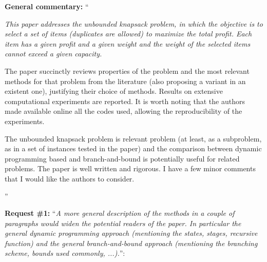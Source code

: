 \documentclass{elsarticle}
\begin{document}
\textbf{General commentary:} ``{\itshape
This paper addresses the unbounded knapsack problem, in which the objective is to select a set of items (duplicates are allowed) to maximize the total profit. Each item has a given profit and a given weight and the weight of the selected items cannot exceed a given capacity.

The paper succinctly reviews properties of the problem and the most relevant methods for that problem from the literature (also proposing a variant in an existent one), justifying their choice of methods. Results on extensive computational experiments are reported. It is worth noting that the authors made available online all the codes used, allowing the reproducibility of the experiments.

The unbounded knapsack problem is relevant problem (at least, as a subproblem, as in a set of instances tested in the paper) and the comparison between dynamic programming based and branch-and-bound is potentially useful for related problems. The paper is well written and rigorous. I have a few minor comments that I would like the authors to consider.
}''

\textbf{Request \#1:} ``\textit{A more general description of the methods in a couple of paragraphs would widen the potential readers of the paper. In particular the general dynamic programming approach (mentioning the states, stages, recursive function) and the general branch-and-bound approach (mentioning the branching scheme, bounds used commonly, ...).}'':
\end{document}

